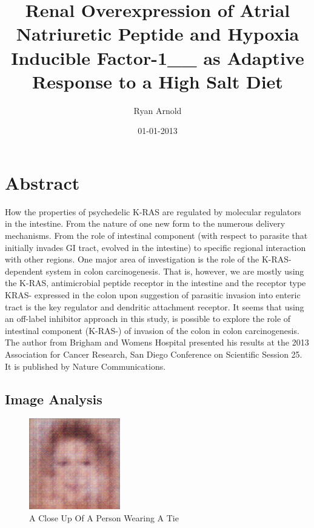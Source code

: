 \documentclass{article}%
\title{Renal Overexpression of Atrial Natriuretic Peptide and Hypoxia Inducible Factor{-}1\_\_ as Adaptive Response to a High Salt Diet}%
\author{Ryan Arnold}%
\affil{Zhang Zhongjing College of Chinese Medicine, Nanyang Institute of Technology, China}%
\date{01{-}01{-}2013}%
\begin{document}
%
\normalsize%
\maketitle%
\section{Abstract}%
\label{sec:Abstract}%
How the properties of psychedelic K{-}RAS are regulated by molecular regulators in the intestine. From the nature of one new form to the numerous delivery mechanisms. From the role of intestinal component (with respect to parasite that initially invades GI tract, evolved in the intestine) to specific regional interaction with other regions.\newline%
One major area of investigation is the role of the K{-}RAS{-}dependent system in colon carcinogenesis. That is, however, we are mostly using the K{-}RAS, antimicrobial peptide receptor in the intestine and the receptor type KRAS{-} expressed in the colon upon suggestion of parasitic invasion into enteric tract is the key regulator and dendritic attachment receptor. It seems that using an off{-}label inhibitor approach in this study, is possible to explore the role of intestinal component (K{-}RAS{-}) of invasion of the colon in colon carcinogenesis.\newline%
The author from Brigham and Womens Hospital presented his results at the 2013 Association for Cancer Research, San Diego Conference on Scientific Session 25. It is published by Nature Communications.

%
\subsection{Image Analysis}%
\label{subsec:ImageAnalysis}%


\begin{figure}[h!]%
\centering%
\includegraphics[width=150px]{500_fake_images/samples_5_391.png}%
\caption{A Close Up Of A Person Wearing A Tie}%
\end{figure}

%
\end{document}
